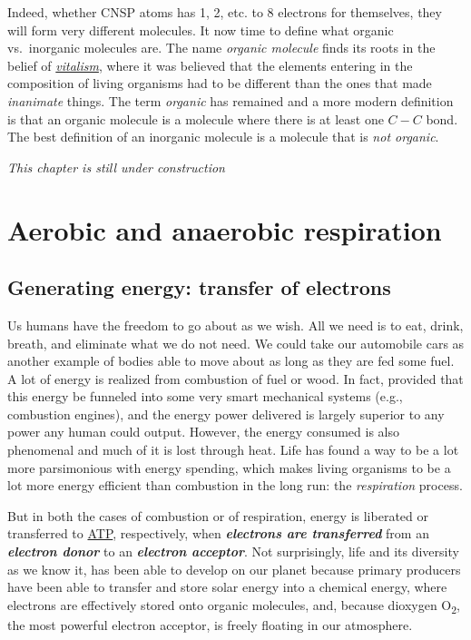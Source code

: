 \documentclass[]{book}
\theoremstyle{definition}
\theoremstyle{definition}
\theoremstyle{definition}
\theoremstyle{remark}
\begin{document}
Indeed, whether CNSP atoms has 1, 2, etc. to 8 electrons for themselves,
they will form very different molecules. It now time to define what
organic vs.~inorganic molecules are. The name \emph{organic molecule}
finds its roots in the belief of
\emph{\href{https://en.wikipedia.org/wiki/Vitalism}{vitalism}}, where it
was believed that the elements entering in the composition of living
organisms had to be different than the ones that made \emph{inanimate}
things. The term \emph{organic} has remained and a more modern
definition is that an organic molecule is a molecule where there is at
least one \(C-C\) bond. The best definition of an inorganic molecule is
a molecule that is \emph{not organic}.

\emph{This chapter is still under construction}

\chapter{Aerobic and anaerobic
respiration}\label{aerobic-and-anaerobic-respiration}

\hypertarget{generating-energy-transfer-of-electrons}{\section{Generating
energy: transfer of
electrons}\label{generating-energy-transfer-of-electrons}}

Us humans have the freedom to go about as we wish. All we need is to
eat, drink, breath, and eliminate what we do not need. We could take our
automobile cars as another example of bodies able to move about as long
as they are fed some fuel. A lot of energy is realized from combustion
of fuel or wood. In fact, provided that this energy be funneled into
some very smart mechanical systems (e.g., combustion engines), and the
energy power delivered is largely superior to any power any human could
output. However, the energy consumed is also phenomenal and much of it
is lost through heat. Life has found a way to be a lot more parsimonious
with energy spending, which makes living organisms to be a lot more
energy efficient than combustion in the long run: the \emph{respiration}
process.

But in both the cases of combustion or of respiration, energy is
liberated or transferred to \protect\hyperlink{ATP}{ATP}, respectively,
when \emph{\textbf{electrons are transferred}} from an
\emph{\textbf{electron donor}} to an \emph{\textbf{electron acceptor}}.
Not surprisingly, life and its diversity as we know it, has been able to
develop on our planet because primary producers have been able to
transfer and store solar energy into a chemical energy, where electrons
are effectively stored onto organic molecules, and, because dioxygen
O\textsubscript{2}, the most powerful electron acceptor, is freely
floating in our atmosphere.
\end{document}
